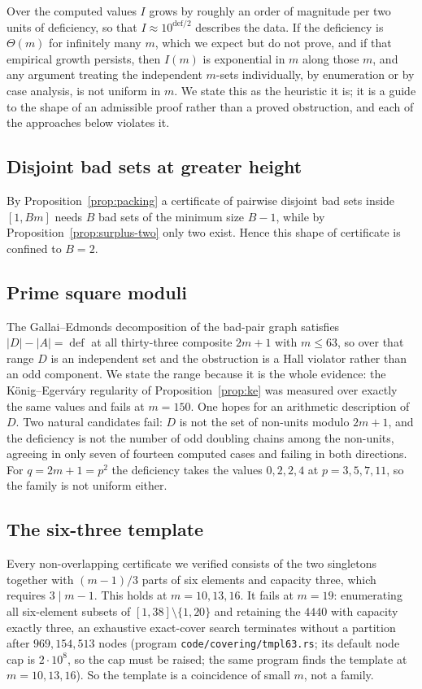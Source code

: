 \documentclass[11pt]{amsart}
\theoremstyle{plain}
\theoremstyle{definition}
\begin{document}
Over the computed values $I$ grows by roughly an order of magnitude per two units of deficiency, so
that $I \approx 10^{\mathrm{def}/2}$ describes the data. If the deficiency is $\Theta(m)$ for
infinitely many $m$, which we expect but do not prove, and if that empirical growth persists, then
$I(m)$ is exponential in $m$ along those $m$, and any argument treating the independent $m$-sets
individually, by enumeration or by case analysis, is not uniform in $m$. We state this as the
heuristic it is; it is a guide to the shape of an admissible proof rather than a proved obstruction,
and each of the approaches below violates it.

\subsection*{Disjoint bad sets at greater height} By Proposition~\ref{prop:packing} a certificate of
pairwise disjoint bad sets inside $[1,Bm]$ needs $B$ bad sets of the minimum size $B-1$, while by
Proposition~\ref{prop:surplus-two} only two exist. Hence this shape of certificate is confined to
$B = 2$.

\subsection*{Prime square moduli} The Gallai--Edmonds decomposition of the bad-pair graph satisfies
$|D| - |A| = \operatorname{def}$ at all thirty-three composite $2m+1$ with $m \le 63$, so over that
range $D$ is an independent set and the obstruction is a Hall violator rather than an odd component.
We state the range because it is the whole evidence: the K\"onig--Egerv\'ary regularity of
Proposition~\ref{prop:ke} was measured over exactly the same values and fails at $m = 150$. One hopes for an arithmetic
description of $D$. Two natural candidates fail: $D$ is not the set of non-units modulo $2m+1$, and
the deficiency is not the number of odd doubling chains among the non-units, agreeing in only seven
of fourteen computed cases and failing in both directions. For $q = 2m+1 = p^2$ the deficiency takes
the values $0, 2, 2, 4$ at $p = 3,5,7,11$, so the family is not uniform either.

\subsection*{The six-three template} Every non-overlapping certificate we verified consists of the
two singletons together with $(m-1)/3$ parts of six elements and capacity three, which requires
$3 \mid m-1$. This holds at $m = 10, 13, 16$. It fails at $m = 19$: enumerating all six-element
subsets of $[1,38] \setminus \{1,20\}$ and retaining the $4440$ with capacity exactly three, an
exhaustive exact-cover search terminates without a partition after $969{,}154{,}513$ nodes (program \texttt{code/covering/tmpl63.rs}; its default node cap is $2\cdot10^{8}$, so the cap must be raised; the same program finds the template at $m=10,13,16$). So the
template is a coincidence of small $m$, not a family.
\end{document}
